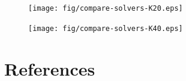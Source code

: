 \documentclass{elsarticle}
\begin{document}
\begin{figure}[h!]
\begin{center}
\texttt{[image: fig/compare-solvers-K20.eps]}
\end{center}
\label{fig:compare-solvers-K20}
\end{figure}

\begin{figure}[h!]
\begin{center}
\texttt{[image: fig/compare-solvers-K40.eps]}
\end{center}
\label{fig:compare-solvers-K40}
\end{figure}

\pagebreak
\section*{References}



\end{document}
